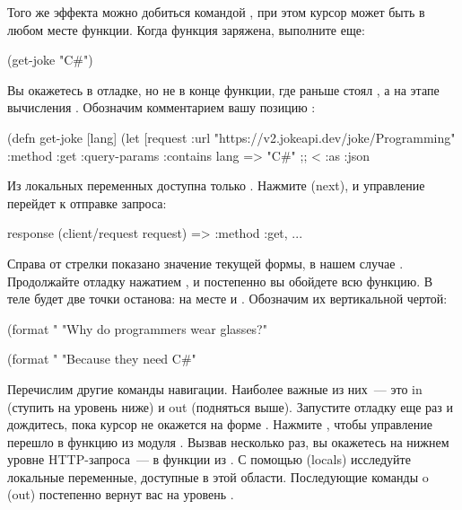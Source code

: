 Того же эффекта можно добиться командой , при этом курсор может быть в любом месте функции. Когда функция заряжена, выполните еще:

\begin{english}
  \begin{clojure}
(get-joke "C#")
  \end{clojure}
\end{english}

Вы окажетесь в отладке, но не в конце функции, где раньше стоял , а на этапе вычисления . Обозначим комментарием вашу позицию :

\begin{english}
  \begin{clojure/lines}
(defn get-joke [lang]
  (let [request
        {:url "https://v2.jokeapi.dev/joke/Programming"
         :method :get
         :query-params {:contains lang} => "C#" ;; <
         :as :json}
  \end{clojure/lines}
\end{english}

Из локальных переменных доступна только . Нажмите  (next), и управление перейдет к отправке запроса:

\begin{english}
  \begin{clojure}
response
(client/request request) => {:method :get, ...}
  \end{clojure}
\end{english}

Справа от стрелки показано значение текущей формы, в нашем случае . Продолжайте отладку нажатием , и постепенно вы обойдете всю функцию. В теле  будет две точки останова: на месте  и . Обозначим их вертикальной чертой:

\begin{english}
  \begin{clojure}
(format "%
  "Why do programmers wear glasses?"

(format "%
  "Because they need C#"
  \end{clojure}
\end{english}


Перечислим другие команды навигации. Наиболее важные из них~--- это in (ступить на уровень ниже) и out (подняться выше). Запустите отладку еще раз и дождитесь, пока курсор не окажется на форме . Нажмите , чтобы управление перешло в функцию  из модуля . Вызвав  несколько раз, вы окажетесь на нижнем уровне HTTP-запроса~--- в функции  из . С помощью  (locals) исследуйте локальные переменные, доступные в этой области. Последующие команды o (out) постепенно вернут вас на уровень .

